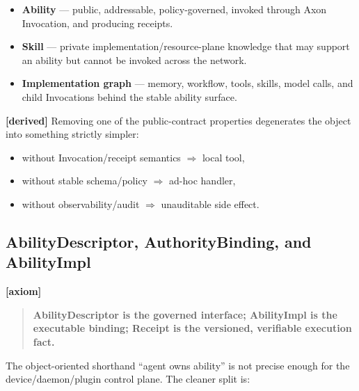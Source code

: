 \documentclass[11pt,a4paper]{article}
\newcommand{\axiom}{\textcolor{axiomcolor}{\textbf{[axiom]}}\xspace}
\newcommand{\derived}{\textcolor{derivedcolor}{\textbf{[derived]}}\xspace}
\begin{document}
\begin{itemize}[leftmargin=2em,itemsep=0.3em]
    \item \textbf{Ability} --- public, addressable, policy-governed, invoked
    through Axon Invocation, and producing receipts.
    \item \textbf{Skill} --- private implementation/resource-plane knowledge
    that may support an ability but cannot be invoked across the network.
    \item \textbf{Implementation graph} --- memory, workflow, tools, skills,
    model calls, and child Invocations behind the stable ability surface.
\end{itemize}

\derived{} Removing one of the public-contract properties degenerates the
object into something strictly simpler:
\begin{itemize}[leftmargin=2em,itemsep=0.2em]
    \item without Invocation/receipt semantics $\Rightarrow$ local tool,
    \item without stable schema/policy $\Rightarrow$ ad-hoc handler,
    \item without observability/audit $\Rightarrow$ unauditable side effect.
\end{itemize}

\subsection{AbilityDescriptor, AuthorityBinding, and AbilityImpl}

\axiom{}
\begin{quote}
\textbf{AbilityDescriptor is the governed interface; AbilityImpl is the
executable binding; Receipt is the versioned, verifiable execution fact.}
\end{quote}

The object-oriented shorthand ``agent owns ability'' is not precise enough for
the device/daemon/plugin control plane. The cleaner split is:
\end{document}
